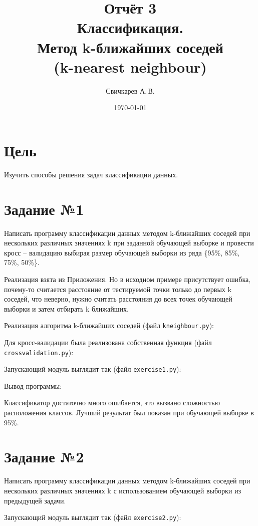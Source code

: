 \documentclass{article} %
\title{Отчёт 3\protect\\Классификация.\\Метод k-ближайших соседей\\(k-nearest
neighbour)} %
\author{Свичкарев А.\,В.} %
\date{\today} %
\begin{document}

\maketitle %

\section{Цель}
Изучить способы решения задач классификации данных.

\section{Задание №1}
Написать программу классификации данных методом k-ближайших соседей при
нескольких различных значениях k при заданной обучающей выборке и провести кросс –
валидацию выбирая размер обучающей выборки из ряда \{95\%, 85\%, 75\%, 50\%\}.
\bigskip

Реализация взята из Приложения.
Но в исходном примере присутствует ошибка,
почему-то считается расстояние от тестируемой точки
только до первых k соседей, что неверно,
нужно считать расстояния до всех точек обучающей выборки
и затем отбирать k ближайших.

\clearpage
Реализация алгоритма k-ближайших соседей (файл \verb$kneighbour.py$):

\clearpage
Для кросс-валидации была реализована собственная функция (файл \verb$crossvalidation.py$):

\clearpage
Запускающий модуль выглядит так (файл \verb$exercise1.py$):
\bigskip


Вывод программы:


Классификатор достаточно много ошибается,
это вызвано сложностью расположения классов.
Лучший результат был показан при обучающей выборке в 95\%.

\clearpage
\section{Задание №2}
Написать программу классификации данных методом k-ближайших соседей при
нескольких различных значениях k с использованием обучающей выборки из предыдущей
задачи.
\bigskip

Запускающий модуль выглядит так (файл \verb$exercise2.py$):
\bigskip
\end{document}
